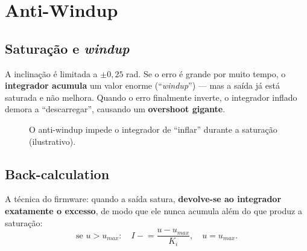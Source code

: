 \chapter{Anti-Windup}\label{cap:windup}

\section{Satura\c{c}\~ao e \emph{windup}}
A inclina\c{c}\~ao \'e limitada a $\pm0{,}25$ rad. Se o erro \'e grande por muito
tempo, o \textbf{integrador acumula} um valor enorme (``\emph{windup}'') --- mas a
sa\'ida j\'a est\'a saturada e n\~ao melhora. Quando o erro finalmente inverte, o
integrador inflado demora a ``descarregar'', causando um \textbf{overshoot
gigante}.

\begin{figure}[h]\centering
{}
\caption{O anti-windup impede o integrador de ``inflar'' durante a satura\c{c}\~ao (ilustrativo).}
\label{fig:windup}
\end{figure}

\section{Back-calculation}
A t\'ecnica do firmware: quando a sa\'ida satura, \textbf{devolve-se ao integrador
exatamente o excesso}, de modo que ele nunca acumula al\'em do que produz a
satura\c{c}\~ao:
\begin{equation}
\text{se } u>u_{max}:\quad I \mathrel{-}= \frac{u-u_{max}}{K_i},\quad u=u_{max}.
\end{equation}

